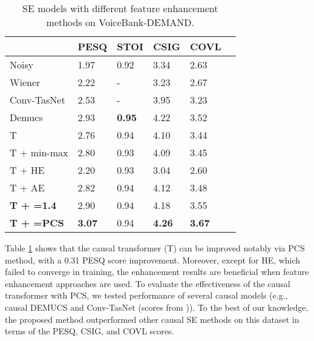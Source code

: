 \documentclass[a4paper]{article}
\begin{document}
\begin{table}
\caption{SE models with different feature enhancement methods on VoiceBank-DEMAND.}
\vspace{-0.2cm}
\label{table_1}
\centering
\begin{tabular*}{\linewidth}{l||lllll} 
\hline
                  & PESQ  & STOI  & CSIG  & COVL  \\ 
\hline
Noisy             & 1.97 & 0.92 & 3.34 & 2.63 \\
\hline
Wiener \cite{pascual2017segan} & 2.22 & - & 3.23 & 2.67 \\
Conv-TasNet \cite{koyama2020exploring} & 2.53 & - & 3.95 & 3.23 \\ 
Demucs \cite{defossez2020real} & 2.93  & \textbf{0.95}   & 4.22  & 3.52 \\
T \cite{fu2020boosting} & 2.76 & 0.94 & 4.10 & 3.44 \\
T + min-max       & 2.80 & 0.93 & 4.09 & 3.45 \\
T + HE  & 2.20 & 0.93 & 3.04 & 2.60 & \\
T + AE            & 2.82 & 0.94 & 4.12 & 3.48 \\
\hline
\hline
\textbf{T + =1.4}   & 2.90 & 0.94 & 4.18 & 3.55 \\
\textbf{T + \boldsymbol{}=PCS} & \textbf{3.07} & 0.94 & \textbf{4.26} & \textbf{3.67} \\
\hline
\end{tabular*}
\end{table}
Table \ref{table_1} shows that the causal transformer (T) can be improved notably via PCS method, with a 0.31 PESQ score improvement. Moreover, except for HE, which failed to converge in training, the enhancement results are beneficial when feature enhancement approaches are used. To evaluate the effectiveness of the causal transformer with PCS, we tested performance of several causal models (e.g., causal DEMUCS \cite{defossez2020real} and Conv-TasNet (scores from \cite{koyama2020exploring})).
To the best of our knowledge, the proposed method outperformed other causal SE methods on this dataset in terms of the PESQ, CSIG, and COVL scores.
\end{document}
